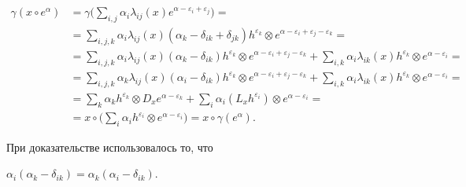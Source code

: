 \begin{align*} 


\gamma(x\circ e^\alpha)&=\gamma\bigg(\sum_{i,j}\alpha_i 


\lambda_{ij}(x)e^{\alpha-\varepsilon_i+\varepsilon_j}\bigg)=\\


%


&=\sum_{i,j,k}\alpha_i \lambda_{ij}(x)(\alpha_k-\delta_{ik} 


+\delta_{jk})h^{\varepsilon_k}\otimes 


e^{\alpha-\varepsilon_i+\varepsilon_j-\varepsilon_k}= \\ 


% 


&=\sum_{i,j,k}\alpha_i \lambda_{ij}(x)(\alpha_k-\delta_{ik}) 


h^{\varepsilon_k}\otimes 


e^{\alpha-\varepsilon_i+\varepsilon_j-\varepsilon_k}+ 


\sum_{i,k}\alpha_i \lambda_{i k}(x)h^{\varepsilon_k} 


\otimes e^{\alpha-\varepsilon_i}= \\ 


% 


&=\sum_{i,j,k}\alpha_k \lambda_{ij}(x)(\alpha_i-\delta_{i k}) 


h^{\varepsilon_k}\otimes 


e^{\alpha-\varepsilon_i+\varepsilon_j-\varepsilon_k}+ 


\sum_{i,k}\alpha_i \lambda_{i k}(x) 


h^{\varepsilon_k}\otimes e^{\alpha-\varepsilon_i}= \\ 


% 


&=\sum_k \alpha_k h^{\varepsilon_k}\otimes D_x e^{\alpha-\varepsilon_k} 


+\sum_i \alpha_i(L_x h^{\varepsilon_i})\otimes 


e^{\alpha-\varepsilon_i}= \\


&=x\circ\bigg(\sum_i \alpha_i h^{\varepsilon_i}\otimes 


e^{\alpha-\varepsilon_i}\bigg)=x\circ\gamma(e^\alpha). 


\end{align*} 


При доказательстве использовалось то, что 


$\alpha_i(\alpha_k-\delta_{i k})=\alpha_k(\alpha_i-\delta_{i k})$. 


